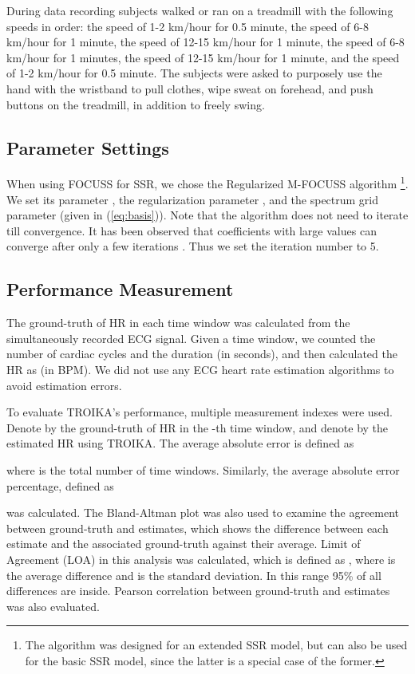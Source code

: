 \documentclass[10pt,twocolumn]{IEEEtran}
\begin{document}
During data recording subjects walked or ran on a treadmill with the following speeds in order: the speed of 1-2 km/hour for 0.5 minute, the speed of 6-8 km/hour for 1 minute, the speed of 12-15 km/hour for 1 minute, the speed of 6-8 km/hour for 1 minutes, the speed of 12-15 km/hour for 1 minute, and the speed of 1-2 km/hour for 0.5 minute. The subjects were asked to purposely use the hand with the wristband to pull clothes, wipe sweat on forehead, and push buttons on the treadmill, in addition to freely swing.


\subsection{Parameter Settings}


When using FOCUSS for SSR, we chose the Regularized M-FOCUSS algorithm \cite{cotter2005sparse} \footnote{The algorithm was designed for an extended SSR model, but can also be used for the basic SSR model, since the latter is a special case of the former.}. We set its parameter , the regularization parameter , and the spectrum grid parameter  (given in (\ref{eq:basis})). Note that the algorithm does not need to iterate till convergence. It has been observed that coefficients with large values can converge after only a few iterations \cite{Gorodnitsky1997}. Thus we set the iteration number to 5.






\subsection{Performance Measurement}
\label{subsec:performance}

The ground-truth of HR in each time window was calculated from the simultaneously recorded ECG signal. Given a time window, we counted the number of cardiac cycles  and the duration  (in seconds), and then calculated the HR as  (in BPM). We did not use any ECG heart rate estimation algorithms to avoid  estimation errors.

To evaluate TROIKA's performance, multiple measurement indexes were used.
Denote by  the ground-truth of HR in the -th time window, and denote by  the estimated HR using TROIKA. The average absolute  error is defined as

where  is the total number of time windows.  Similarly, the average absolute error percentage, defined as

was calculated. The Bland-Altman plot \cite{martin1986statistical} was also used to examine the agreement between ground-truth and estimates, which shows the difference between  each estimate and the associated ground-truth against their average. Limit of Agreement (LOA) in this analysis was calculated, which is defined as , where  is the average difference and  is the standard deviation. In this range 95\% of all differences are inside. Pearson correlation between  ground-truth and  estimates was also evaluated.
\end{document}
